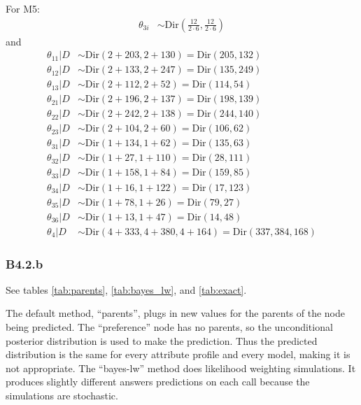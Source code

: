 \documentclass{article}
\begin{document}
For M5: \begin{align*}
    \theta_{3i} &\sim \mathrm{Dir}\left(\frac{12}{2 \cdot 6}, \frac{12}{2 \cdot 6} \right)
\end{align*} and \begin{align*}
    \theta_{11}|D &\sim \mathrm{Dir}(2{+}203, 2{+}130) = \mathrm{Dir}(205, 132) \\
    \theta_{12}|D &\sim \mathrm{Dir}(2{+}133, 2{+}247) = \mathrm{Dir}(135, 249) \\
    \theta_{13}|D &\sim \mathrm{Dir}(2{+}112, 2{+}52) = \mathrm{Dir}(114, 54) \\
    \theta_{21}|D &\sim \mathrm{Dir}(2{+}196, 2{+}137) = \mathrm{Dir}(198, 139) \\
    \theta_{22}|D &\sim \mathrm{Dir}(2{+}242, 2{+}138) = \mathrm{Dir}(244, 140) \\
    \theta_{23}|D &\sim \mathrm{Dir}(2{+}104, 2{+}60) = \mathrm{Dir}(106, 62) \\
    \theta_{31}|D &\sim \mathrm{Dir}(1{+}134, 1{+}62) = \mathrm{Dir}(135, 63) \\
    \theta_{32}|D &\sim \mathrm{Dir}(1{+}27, 1{+}110) = \mathrm{Dir}(28, 111) \\
    \theta_{33}|D &\sim \mathrm{Dir}(1{+}158, 1{+}84) = \mathrm{Dir}(159, 85) \\
    \theta_{34}|D &\sim \mathrm{Dir}(1{+}16, 1{+}122) = \mathrm{Dir}(17, 123) \\
    \theta_{35}|D &\sim \mathrm{Dir}(1{+}78, 1{+}26) = \mathrm{Dir}(79, 27) \\
    \theta_{36}|D &\sim \mathrm{Dir}(1{+}13, 1{+}47) = \mathrm{Dir}(14, 48) \\
    \theta_4|D &\sim \mathrm{Dir}(4{+}333, 4{+}380, 4{+}164) = \mathrm{Dir}(337, 384, 168)
\end{align*}

\subsubsection*{B4.2.b}
\label{sec:B:B4:2.b}

See tables \ref{tab:parents}, \ref{tab:bayes_lw}, and \ref{tab:exact}.

The default method, ``parents'', plugs in new values for the parents of the node being predicted. The ``preference'' node has no parents, so the unconditional posterior distribution is used to make the prediction. Thus the predicted distribution is the same for every attribute profile and every model, making it is not appropriate. The ``bayes-lw'' method does likelihood weighting simulations. It produces slightly different answers predictions on each call because the simulations are stochastic.
\end{document}
